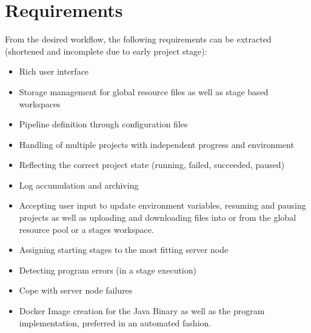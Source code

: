 \section{Requirements}

From the desired workflow, the following requirements can be extracted (shortened and incomplete due to early project stage):

\begin{itemize}
	\item Rich user interface
	\item Storage management for global resource files as well as stage based workspaces
	\item Pipeline definition through configuration files
	\item Handling of multiple projects with independent progress and environment
	\item Reflecting the correct project state (running, failed, succeeded, paused)
	\item Log accumulation and archiving
	\item Accepting user input to update environment variables, resuming and pausing projects as well as uploading and downloading files into or from the global resource pool or a stages workspace.
	\item Assigning starting stages to the most fitting server node
	\item Detecting program errors (in a stage execution)
	\item Cope with server node failures
	\item Docker Image creation for the Java Binary as well as the program implementation, preferred in an automated fashion.
	
\end{itemize}
